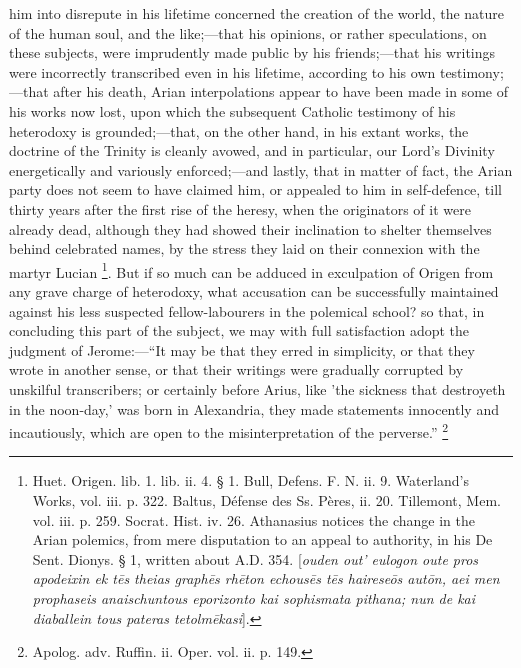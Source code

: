 him into disrepute in his lifetime concerned the creation of the
world, the nature of the human soul, and the like;—that his
opinions, or rather speculations, on these subjects, were imprudently
made public by his friends;—that his writings were incorrectly
transcribed even in his lifetime, according to his own testimony;—that
after his death, Arian interpolations appear to have been made in some
of his works now lost, upon which the subsequent Catholic testimony of
his heterodoxy is grounded;—that, on the other hand, in his extant
works, the doctrine of the Trinity is cleanly avowed, and in
particular, our Lord's Divinity energetically and variously enforced;—and
lastly, that in matter of fact, the Arian party does not seem to have
claimed him, or appealed to him in self-defence, till thirty years
after the first rise of the heresy, when the originators of it were
already dead, although they had showed their inclination to shelter
themselves behind celebrated names, by the stress they laid on their
connexion with the martyr Lucian \footnote{Huet. Origen. lib. 1. lib. ii. 4. § 1.
Bull, Defens. F. N. ii. 9. Waterland's Works, vol. iii. p. 322. Baltus,
Défense des Ss. Pères, ii. 20. Tillemont, Mem. vol. iii. p. 259.
Socrat. Hist. iv. 26. Athanasius notices the change in the Arian
polemics, from mere disputation to an appeal to authority, in his De
Sent. Dionys. § 1, written about A.D. 354. [\emph{ouden
out' eulogon oute pros apodeixin ek t\={e}s theias graph\={e}s rh\={e}ton
echous\={e}s t\={e}s hairese\={o}s aut\={o}n, aei men
prophaseis anaischuntous eporizonto kai sophismata pithana; nun de kai
diaballein tous pateras tetolm\={e}kasi}].}. But if so much can be adduced in exculpation of Origen from
any grave charge of heterodoxy, what accusation can be successfully
maintained against his less suspected fellow-labourers in the
polemical school? so that, in concluding this part of the subject, we
may with full satisfaction adopt the judgment of Jerome:—``It
may be that they erred in simplicity, or that they wrote in another
sense, or that their writings were gradually corrupted by unskilful
transcribers; or certainly before Arius, like 'the sickness that
destroyeth in the noon-day,' was born in Alexandria, they made
statements innocently and incautiously, which are open to the
misinterpretation of the perverse.'' \footnote{Apolog. adv. Ruffin. ii. Oper. vol. ii. p.
149.}



